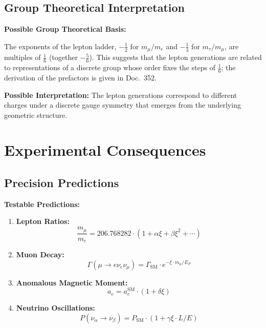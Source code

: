 	\subsection{Group Theoretical Interpretation}
	
	\begin{treatise}
		\textbf{Possible Group Theoretical Basis:}
		
		The exponents of the lepton ladder, $-\tfrac12$ for $m_\mu/m_e$ and $-\tfrac13$ for $m_\tau/m_\mu$, are multiples of $\tfrac16$ (together $-\tfrac56$). This suggests that the lepton generations are related to representations of a discrete group whose order fixes the steps of $\tfrac16$; the derivation of the prefactors is given in Doc.~352.
		
		
		\textbf{Possible Interpretation:}
		The lepton generations correspond to different charges under a discrete gauge symmetry that emerges from the underlying geometric structure.
	\end{treatise}

	\section{Experimental Consequences}
	
	\subsection{Precision Predictions}
	
	\begin{application}
		\textbf{Testable Predictions:}
		
		\begin{enumerate}
			\item \textbf{Lepton Ratios:}
			\begin{equation}
				\frac{m_\mu}{m_e} = 206.768282 \cdot (1 + \alpha \xi + \beta \xi^2 + \cdots)
			\end{equation}
			
			\item \textbf{Muon Decay:}
			\begin{equation}
				\Gamma(\mu \to e\nu_e\nu_\mu) = \Gamma_{\text{SM}} \cdot e^{-\xi \cdot m_\mu/E_P}
			\end{equation}
			
			\item \textbf{Anomalous Magnetic Moment:}
			\begin{equation}
				a_e = a_e^{\text{SM}} \cdot (1 + \delta \xi)
			\end{equation}
			
			\item \textbf{Neutrino Oscillations:}
			\begin{equation}
				P(\nu_\alpha \to \nu_\beta) = P_{\text{SM}} \cdot (1 + \gamma \xi \cdot L/E)
			\end{equation}
		\end{enumerate}
	\end{application}
	